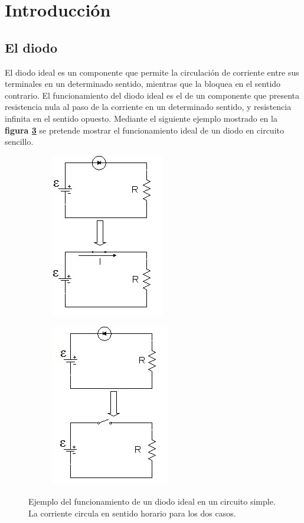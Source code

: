 \documentclass[11pt,a4paper]{article}
\begin{document}
\section{Introducción}\label{sec:intro}
\subsection{El diodo}
El diodo ideal es un componente que permite la circulación de corriente entre sus terminales en un determinado sentido, mientras que la bloquea en el sentido contrario. El funcionamiento del diodo ideal es el de un componente que presenta resistencia nula al paso de la corriente en un determinado sentido, y resistencia infinita en el sentido opuesto.
Mediante el siguiente ejemplo mostrado en la \textbf{figura \ref{fig:Ejemplo}} se pretende mostrar el funcionamiento ideal de un diodo en circuito sencillo.

\begin{figure}[H]

\begin{subfigure}{0.5\textwidth}
\centering
\includegraphics[scale=0.8]{Ejemplo-Funcionamiento-Diodo-Ideal-Polarizacion-Directa}
   \label{subfig:Pol-Dir}
\end{subfigure}
\begin{subfigure}{0.5\textwidth}
\centering
\includegraphics[scale=0.8]{Ejemplo-Funcionamiento-Diodo-Ideal-Polarizacion-Inversa}
   \label{subfig:Pol-Inv}
\end{subfigure}

  \caption{Ejemplo del funcionamiento de un diodo ideal en un circuito simple. La corriente circula en sentido horario para los dos casos.}
   \label{fig:Ejemplo}
\end{figure}
\end{document}
